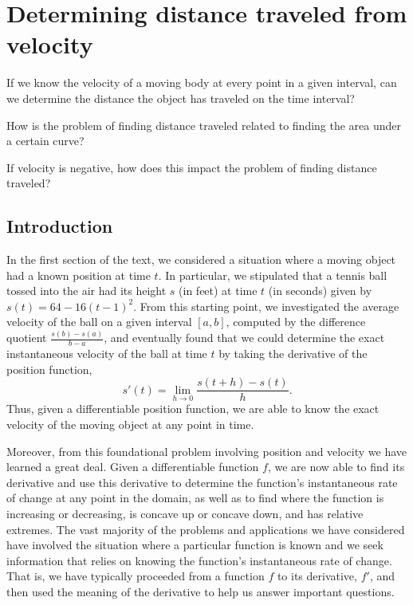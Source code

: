 \section{Determining distance traveled from velocity} \label{S:4.1.VelocityDistance}

\begin{goals}
\item If we know the velocity of a moving body at every point in a given interval, can we determine the distance the object has traveled on the time interval?
\item How is the problem of finding distance traveled related to finding the area under a certain curve?
\item If velocity is negative, how does this impact the problem of finding distance traveled?
\end{goals}

\subsection*{Introduction}

In the first section of the text, we considered a situation where a moving object had a known position at time $t$.  In particular, we stipulated that a tennis ball tossed into the air had its height $s$ (in feet) at time $t$ (in seconds) given by $s(t) = 64 - 16(t-1)^2$.  From this starting point, we investigated the average velocity of the ball on a given interval $[a,b]$, computed by the difference quotient $\frac{s(b)-s(a)}{b-a}$, and eventually found that we could determine the exact instantaneous velocity of the ball at time $t$ by taking the derivative of the position function,
\[s'(t) = \lim_{h \to 0} \frac{s(t+h)-s(t)}{h}.\]
Thus, given a differentiable position function, we are able to know the exact velocity of the moving object at any point in time.

Moreover, from this foundational problem involving position and velocity we have learned a great deal.  Given a differentiable function $f$, we are now able to find its derivative and use this derivative to determine the function's instantaneous rate of change at any point in the domain, as well as to find where the function is increasing or decreasing, is concave up or concave down, and has relative extremes.  The vast majority of the problems and applications we have considered have involved the situation where a particular function is known and we seek information that relies on knowing the function's instantaneous rate of change.  That is, we have typically proceeded from a function $f$ to its derivative, $f'$, and then used the meaning of the derivative to help us answer important questions.  


